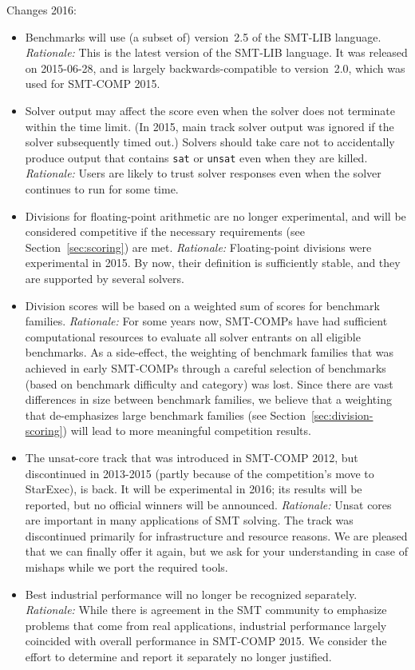 \documentclass[twoside,11pt]{article}
\begin{document}
\begin{tjark}
Changes 2016:
\begin{itemize}
\item Benchmarks will use (a subset of) version~2.5 of the SMT-LIB
  language.  \emph{Rationale:} This is the latest version of the
  SMT-LIB language.  It was released on 2015-06-28, and is largely
  backwards-compatible to version~2.0, which was used for SMT-COMP
  2015.
\item Solver output may affect the score even when the solver does not
  terminate within the time limit.  (In 2015, main track solver output
  was ignored if the solver subsequently timed out.)  Solvers should
  take care not to accidentally produce output that contains
  \texttt{sat} or \texttt{unsat} even when they are killed.
  \emph{Rationale:} Users are likely to trust solver responses even
  when the solver continues to run for some time.
\item Divisions for floating-point arithmetic are no longer
  experimental, and will be considered competitive if the necessary
  requirements (see Section~\ref{sec:scoring}) are met.
  \emph{Rationale:} Floating-point divisions were experimental in
  2015.  By now, their definition is sufficiently stable, and they are
  supported by several solvers.
\item Division scores will be based on a weighted sum of scores for
  benchmark families.  \emph{Rationale:} For some years now, SMT-COMPs
  have had sufficient computational resources to evaluate all solver
  entrants on all eligible benchmarks.  As a side-effect, the
  weighting of benchmark families that was achieved in early SMT-COMPs
  through a careful selection of benchmarks (based on benchmark
  difficulty and category) was lost.  Since there are vast differences
  in size between benchmark families, we believe that a weighting that
  de-emphasizes large benchmark families (see
  Section~\ref{sec:division-scoring}) will lead to more meaningful
  competition results.
\item The unsat-core track that was introduced in SMT-COMP 2012, but
  discontinued in 2013-2015 (partly because of the competition's move
  to StarExec), is back.  It will be experimental in 2016; its results
  will be reported, but no official winners will be announced.
  \emph{Rationale:} Unsat cores are important in many applications of
  SMT solving.  The track was discontinued primarily for
  infrastructure and resource reasons.  We are pleased that we can
  finally offer it again, but we ask for your understanding in case of
  mishaps while we port the required tools.
\item Best industrial performance will no longer be recognized
  separately.  \emph{Rationale:} While there is agreement in the SMT
  community to emphasize problems that come from real applications,
  industrial performance largely coincided with overall performance in
  SMT-COMP 2015.  We consider the effort to determine and report it
  separately no longer justified.
\end{itemize}


\end{tjark}
\end{document}
